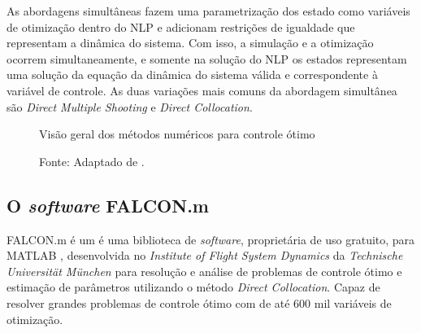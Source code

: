 As abordagens simultâneas fazem uma parametrização dos estado como variáveis de otimização dentro do NLP e adicionam restrições de igualdade que representam a dinâmica do sistema. 
Com isso, a simulação e a otimização ocorrem simultaneamente, e somente na solução do NLP os estados representam uma solução da equação da dinâmica do sistema válida e
correspondente à variável de controle. As duas variações mais comuns da abordagem simultânea são \textit{Direct Multiple Shooting} e \textit{Direct Collocation}. \cite{article:Diehl}

\begin{figure}[h]
	\centering
	\caption{Visão geral dos métodos numéricos para controle ótimo}
	\label{fig:diagrama_metodos_numericos}
	\caption*{\footnotesize Fonte: Adaptado de . \cite{article:Diehl}}
\end{figure}

\subsection{O \textit{software} FALCON.m}

FALCON.m é um é uma biblioteca de \textit{software}, proprietária de uso gratuito, para MATLAB , 
desenvolvida no \textit{Institute of Flight System Dynamics} da \textit{Technische Universit{\"a}t M{\"u}nchen} para resolução e 
análise de problemas de controle ótimo e estimação de parâmetros utilizando o método \textit{Direct Collocation}. Capaz de resolver grandes problemas de controle ótimo com de até 600 mil variáveis de otimização. \cite{manual:Falcon} \cite[Cap.~4]{phd:Rieck}

